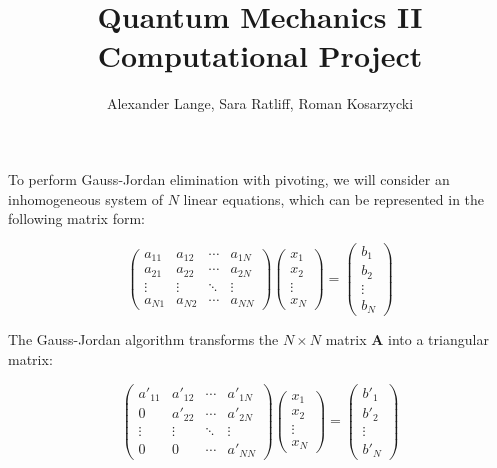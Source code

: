 \documentclass{homework}
\title{Quantum Mechanics II Computational Project}
\author{Alexander Lange, Sara Ratliff, Roman Kosarzycki}
\begin{document}
\maketitle

To perform Gauss-Jordan elimination with pivoting, we will consider an inhomogeneous system of $N$ linear equations, which can be represented in the following matrix form:

\begin{equation}
\label{1}
\begin{pmatrix}
a_{11} & a_{12} & \cdots & a_{1N} \\ a_{21} & a_{22} & \cdots & a_{2N} \\ \vdots & \vdots & \ddots & \vdots \\ a_{N1} & a_{N2} & \cdots & a_{NN}
\end{pmatrix}
\begin{pmatrix}
x_1 \\ x_2 \\ \vdots \\ x_N
\end{pmatrix} = 
\begin{pmatrix}
b_1 \\ b_2 \\ \vdots \\ b_N
\end{pmatrix}
\end{equation}

The Gauss-Jordan algorithm transforms the $N \times N$ matrix $\mathbf{A}$ into a triangular matrix:

\begin{equation}
\label{2}
\begin{pmatrix}
a'_{11} & a'_{12} & \cdots & a'_{1N} \\ 0 & a'_{22} & \cdots & a'_{2N} \\ \vdots & \vdots & \ddots & \vdots \\ 0 & 0 & \cdots & a'_{NN}
\end{pmatrix}
\begin{pmatrix}
x_1 \\ x_2 \\ \vdots \\ x_N
\end{pmatrix} = 
\begin{pmatrix}
b'_1 \\ b'_2 \\ \vdots \\ b'_N
\end{pmatrix}
\end{equation}
\end{document}
